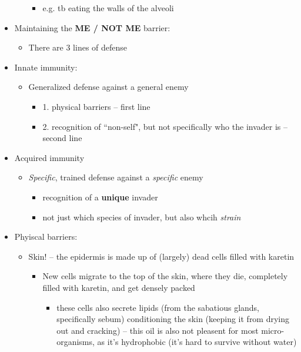 \documentclass{article}
\theoremstyle{definition}
\begin{document}
\begin{itemize}
\begin{itemize}
				\begin{itemize}
					\item e.g. tb eating the walls of the alveoli
				\end{itemize}
		\end{itemize}
	\item Maintaining the \textbf{ME / NOT ME}  barrier:
		\begin{itemize}
			\item There are 3 lines of defense
		\end{itemize}
	\item Innate immunity:
		\begin{itemize}
			\item Generalized defense against a general enemy
				\begin{itemize}
					\item 1. physical barriers -- first line
					\item 2. recognition of ``non-self", but not specifically who the invader is -- second line
				\end{itemize}
		\end{itemize}
	\item Acquired immunity
		\begin{itemize}
			\item \textit{Specific}, trained defense against a \textit{specific} enemy
				\begin{itemize}
					\item recognition of a \textbf{unique} invader
					\item not just which species of invader, but also whcih \textit{strain} 
				\end{itemize}
		\end{itemize}
	\item Phyiscal barriers:
		\begin{itemize}
			\item Skin! -- the epidermis is made up of (largely) dead cells filled with karetin
				\begin{itemize}
					\item New cells migrate to the top of the skin, where they die, completely filled with karetin, and get densely packed 
						\begin{itemize}
							\item these cells also secrete lipids (from the sabatious glands, specifically sebum) conditioning the skin (keeping it from drying out and cracking) -- this oil is also not pleasent for most micro-organisms, as it's hydrophobic (it's hard to survive without water)

\end{itemize}
\end{itemize}
\end{itemize}
\end{itemize}
\end{document}
